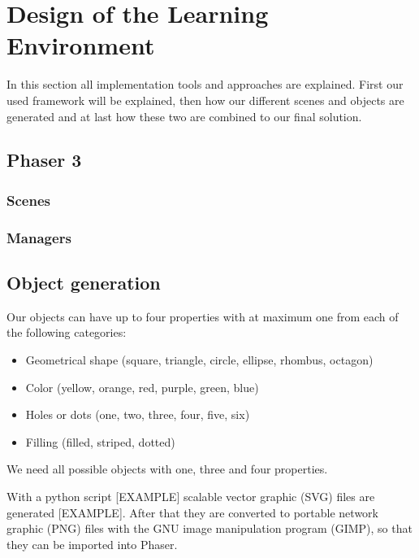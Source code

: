 
\chapter{Design of the Learning Environment}
\label{chap:design}

In this section all implementation tools and approaches are explained.
First our used framework will be explained, then how our different scenes and objects are generated and
at last how these two are combined to our final solution.

\section{Phaser 3}\label{sec:phaser-3}

\subsection{Scenes}\label{subsec:scenes}
\subsection{Managers}\label{subsec:managers}
\section{Object generation}\label{sec:object-generation}
Our objects can have up to four properties with at maximum one from each of the following categories:
\begin{itemize}
    \item Geometrical shape (square, triangle, circle, ellipse, rhombus, octagon)
    \item Color (yellow, orange, red, purple, green, blue)
    \item Holes or dots (one, two, three, four, five, six)
    \item Filling (filled, striped, dotted)
\end{itemize}

We need all possible objects with one, three and four properties.

With a python script [EXAMPLE] scalable vector graphic (SVG) files are generated [EXAMPLE].
After that they are converted to portable network graphic (PNG) files with the GNU image manipulation program (GIMP),
so that they can be imported into Phaser.

